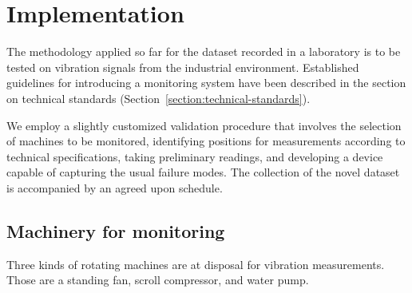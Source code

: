 \chapter{Implementation} \label{section:implementation} 
The methodology applied so far for the dataset recorded in a laboratory is to be tested on vibration signals from the industrial environment. Established guidelines for introducing a monitoring system have been described in the section on technical standards (Section~\ref{section:technical-standards}). 

We employ a slightly customized validation procedure that involves the selection of machines to be monitored, identifying positions for measurements according to technical specifications, taking preliminary readings, and developing a device capable of capturing the usual failure modes. The collection of the novel dataset is accompanied by an agreed upon schedule.

\section{Machinery for monitoring}
Three kinds of rotating machines are at disposal for vibration measurements. Those are a standing fan, scroll compressor, and water pump.

